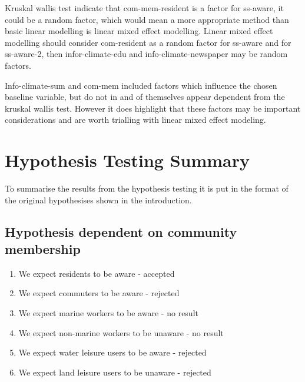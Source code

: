 Kruskal wallis test indicate that com-mem-resident is a factor for ss-aware, it could be a random factor, which would mean a more appropriate method than basic linear modelling is linear mixed effect modelling. Linear mixed effect modelling should consider com-resident as a random factor for ss-aware and for ss-aware-2, then infor-climate-edu and info-climate-newspaper may be random factors.

Info-climate-sum and com-mem included factors which influence the chosen baseline variable, but do not in and of themselves appear dependent from the kruskal wallis test. However it does highlight that these factors may be important considerations and are worth trialling with linear mixed effect modeling.



\section{Hypothesis Testing Summary}
To summarise the results from the hypothesis testing it is put in the format of the original hypothesises shown in the introduction. 

\subsection{Hypothesis dependent on community membership}
\begin{enumerate}
    \item We expect residents to be aware - accepted
    \item We expect commuters to be aware - rejected
    \item We expect marine workers to be aware - no result
    \item We expect non-marine workers to be unaware - no result
    \item We expect water leisure users to be aware - rejected
    \item We expect land leisure users to be unaware - rejected
    \end{enumerate}
